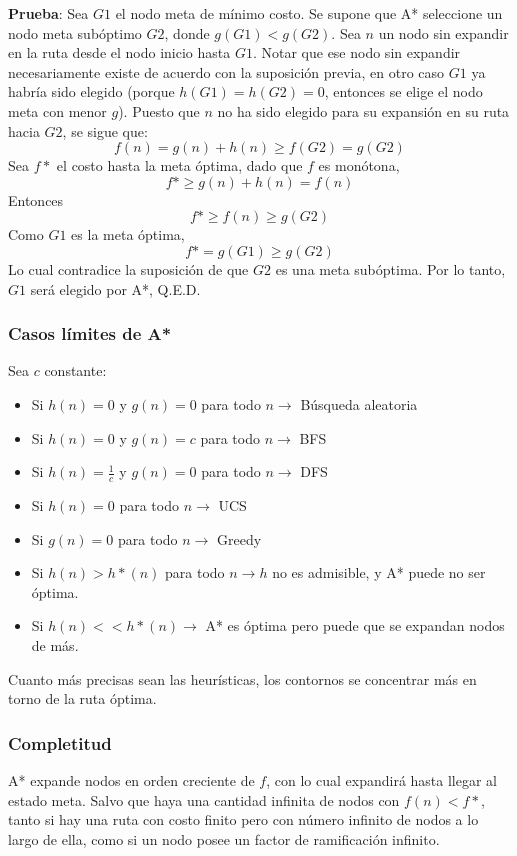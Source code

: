 \documentclass[a4paper,10pt]{paper}
\begin{document}
\textbf{Prueba}: Sea $G1$ el nodo meta de mínimo costo. Se supone que A*
seleccione un nodo meta subóptimo $G2$, donde $g(G1) < g(G2)$. Sea $n$ un nodo
sin expandir en la ruta desde el nodo inicio hasta $G1$. Notar que ese nodo sin
expandir necesariamente existe de acuerdo con la suposición previa, en otro
caso $G1$ ya habría sido elegido (porque $h(G1) = h(G2) = 0$, entonces se elige
el nodo meta con menor $g$). Puesto que $n$ no ha sido elegido para su expansión
en su ruta hacia $G2$, se sigue que:
$$ f(n) = g(n) + h(n) \geq f(G2) = g(G2) $$
Sea $f*$ el costo hasta la meta óptima, dado que $f$ es monótona,
$$ f* \geq g(n) + h(n) = f(n) $$
Entonces
$$ f* \geq f(n) \geq g(G2) $$
Como $G1$ es la meta óptima,
$$ f* = g(G1) \geq g(G2) $$
Lo cual contradice la suposición de que $G2$ es una meta subóptima. Por lo tanto,
$G1$ será elegido por A*, Q.E.D.

\subsubsection{Casos límites de A*}
Sea $c$ constante:
\begin{itemize}
\item Si $h(n) = 0$ y $g(n) = 0$ para todo $n \longrightarrow $ Búsqueda aleatoria
\item Si $h(n) = 0$ y $g(n) = c$ para todo $n \longrightarrow $ BFS
\item Si $h(n) = \frac{1}{c}$ y $g(n) = 0$ para todo $n \longrightarrow $ DFS
\item Si $h(n) = 0$ para todo $n \longrightarrow $ UCS
\item Si $g(n) = 0$ para todo $n \longrightarrow $ Greedy
\item Si $h(n) > h*(n)$ para todo $n \longrightarrow h$ no es admisible, y A*
    puede no ser óptima.
\item Si $h(n) << h*(n) \longrightarrow $ A* es óptima pero puede que se expandan
    nodos de más.
\end{itemize}

Cuanto más precisas sean las heurísticas, los contornos se concentrar más en torno
de la ruta óptima.

\subsubsection{Completitud}
A* expande nodos en orden creciente de $f$, con lo cual expandirá hasta llegar al
estado meta. Salvo que haya una cantidad infinita de nodos con $f(n) < f*$, tanto
si hay una ruta con costo finito pero con número infinito de nodos a lo largo de
ella, como si un nodo posee un factor de ramificación infinito.
\end{document}
